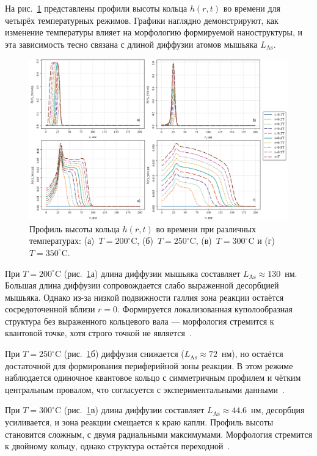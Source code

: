 \documentclass[14pt,oneside]{extarticle}
\begin{document}
На рис.~\ref{fig:h_t} представлены профили высоты кольца $h(r, t)$ во времени для четырёх температурных режимов. Графики наглядно демонстрируют, как изменение температуры влияет на морфологию формируемой наноструктуры, и эта зависимость тесно связана с длиной диффузии атомов мышьяка $L_{\text{As}}$.

\begin{figure}[H]
    \begin{center}
    \includegraphics[width=15cm]{images/h-t.png}
    \caption{\label{fig:h_t} Профиль высоты кольца $h(r, t)$ во времени при различных температурах: (а)~$T = 200^\circ$C, (б)~$T = 250^\circ$C, (в)~$T = 300^\circ$C и (г)~$T = 350^\circ$C.}
    \end{center}
\end{figure}

При $T = 200^\circ$C (рис.~\ref{fig:h_t}а) длина диффузии мышьяка составляет $L_{\text{As}} \approx 130$~нм. Большая длина диффузии сопровождается слабо выраженной десорбцией мышьяка. Однако из-за низкой подвижности галлия зона реакции остаётся сосредоточенной вблизи $r = 0$. Формируется локализованная куполообразная структура без выраженного кольцевого вала — морфология стремится к квантовой точке, хотя строго точкой не является~\cite{zhou2013}.

При $T = 250^\circ$C (рис.~\ref{fig:h_t}б) диффузия снижается ($L_{\text{As}} \approx 72$~нм), но остаётся достаточной для формирования периферийной зоны реакции. В этом режиме наблюдается одиночное квантовое кольцо с симметричным профилем и чётким центральным провалом, что согласуется с экспериментальными данными~\cite{mano2005nano}.

При $T = 300^\circ$C (рис.~\ref{fig:h_t}в) длина диффузии составляет $L_{\text{As}} \approx 44.6$~нм, десорбция усиливается, и зона реакции смещается к краю капли. Профиль высоты становится сложным, с двумя радиальными максимумами. Морфология стремится к двойному кольцу, однако структура остаётся переходной~\cite{mano2005nano}.
\end{document}
